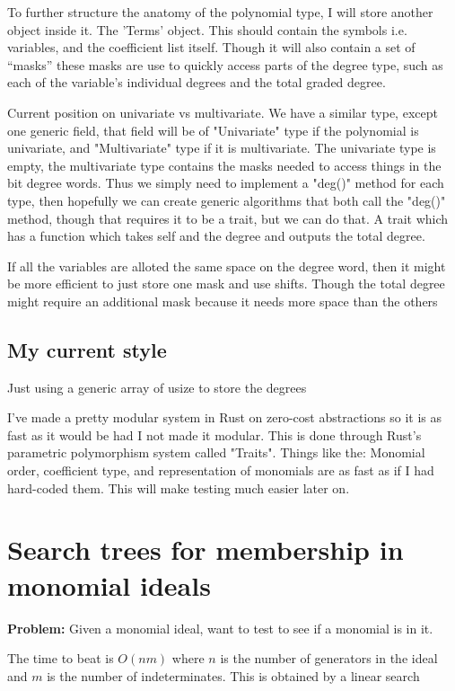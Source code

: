 To further structure the anatomy of the polynomial type, I will store another object inside it. The 'Terms' object. This should contain the symbols i.e. variables, and the coefficient list itself. Though it will also contain a set of ``masks'' these masks are use to quickly access parts of the degree type, such as each of the variable's individual degrees and the total graded degree. 

 Current position on univariate vs multivariate. We have a similar type, except one generic field, that field will be of "Univariate" type if the polynomial is univariate, and "Multivariate" type if it is multivariate. The univariate type is empty, the multivariate type contains the masks needed to access things in the bit degree words. Thus we simply need to implement a "deg()" method for each type, then hopefully we can create generic algorithms that both call the "deg()" method, though that requires it to be a trait, but we can do that. A trait which has a function which takes self and the degree and outputs the total degree.

 If all the variables are alloted the same space on the degree word, then it might be more efficient to just store one mask and use shifts. Though the total degree might require an additional mask because it needs more space than the others

\subsection{My current style}%
\label{sub:My current style}

Just using a generic array of usize to store the degrees

I've made a pretty modular system in Rust on zero-cost abstractions so it is as fast as it would be had I not made it modular.
This is done through Rust's parametric polymorphism system called "Traits". Things like the: Monomial order, coefficient type, and representation of monomials are as fast as if I had hard-coded them. This will make testing much easier later on.

\section{Search trees for membership in monomial ideals}

\textbf{Problem:} Given a monomial ideal, want to test to see if a monomial is in it.

The time to beat is $O(nm)$ where $n$ is the number of generators in the ideal and $m$ is the number of indeterminates. This is obtained by a linear search

